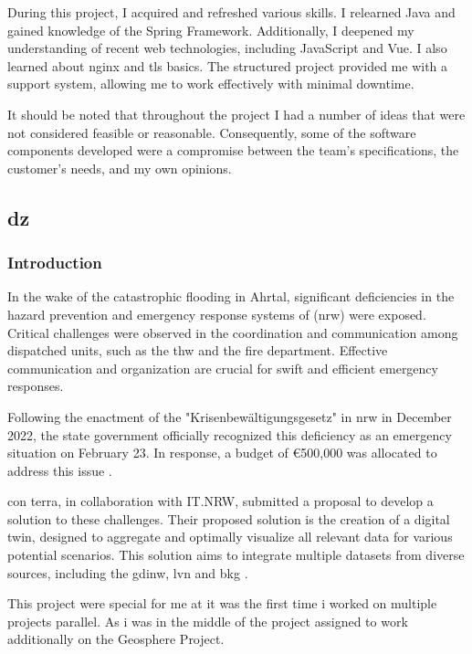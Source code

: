 \documentclass[11pt, titlepage, a4paper]{article}
\begin{document}
During this project, I acquired and refreshed various skills. I relearned Java and gained knowledge of the Spring Framework. Additionally, I deepened my understanding of recent web technologies, including JavaScript and  Vue. I also learned about \Gls{nginx} and \gls{tls} basics.
The structured project provided me with a support system, allowing me to work effectively with minimal downtime.

It should be noted that throughout the project I had a number of ideas that were not considered feasible or reasonable. Consequently, some of the software components developed were a compromise between the team's specifications, the customer's needs, and my own opinions.
\subsection{\gls{dz}}
\subsubsection{Introduction}
In the wake of the catastrophic flooding in Ahrtal, significant deficiencies in the hazard prevention and emergency response systems of (\gls {nrw}) were exposed. Critical challenges were observed in the coordination and communication among dispatched units, such as the  \gls{thw} and the fire department. \cite{anna-laraweidingerAhrtalHochwasser2024} Effective communication and organization are crucial for swift and efficient emergency responses.

Following the enactment of the "Krisenbewältigungsgesetz" in \gls {nrw} in December 2022, the state government officially recognized this deficiency as an emergency situation on February 23. In response, a budget of €500,000 was allocated to address this issue \cite{landesregierungnordrhein-westfalenGesetzZurErrichtung2022}.

con terra, in collaboration with IT.NRW, submitted a proposal to develop a solution to these challenges. Their proposed solution is the creation of a digital twin, designed to aggregate and optimally visualize all relevant data for various potential scenarios. This solution aims to integrate multiple datasets from diverse sources, including the \gls{gdinw}, \gls{lvn} and \gls{bkg} \cite{caffier14GDIForumNordrheinWestfalen}.

This project were special for me at it was the first time i worked on multiple projects parallel. As i was in the middle of the project assigned to work additionally on the Geosphere Project.
\end{document}
